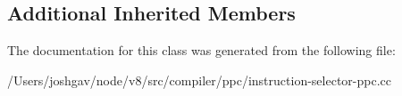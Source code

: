 \subsection*{Additional Inherited Members}


The documentation for this class was generated from the following file\+:\begin{DoxyCompactItemize}
\item 
/\+Users/joshgav/node/v8/src/compiler/ppc/instruction-\/selector-\/ppc.\+cc\end{DoxyCompactItemize}
